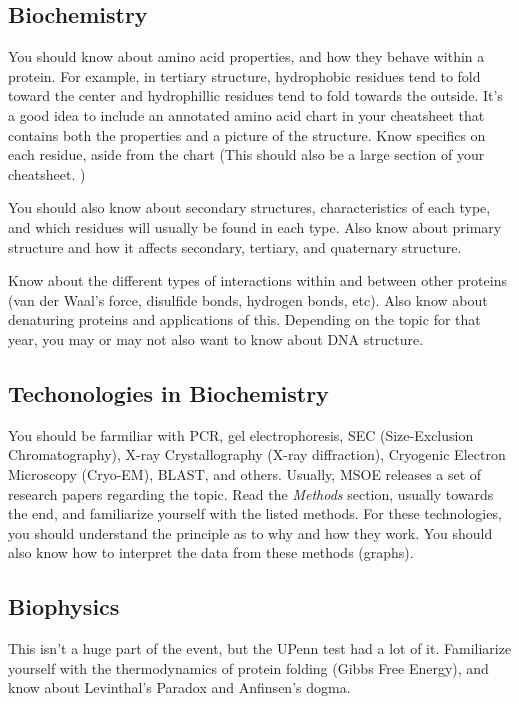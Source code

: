 \documentclass[twocolumn]{article}
\begin{document}
\subsection{Biochemistry}
You should know about amino acid properties, and how they behave within a protein. For example, in tertiary structure, hydrophobic residues tend to fold toward the center and hydrophillic residues tend to fold towards the outside. It's a good idea to include an annotated amino acid chart in your cheatsheet that contains both the properties and a picture of the structure. Know specifics on each residue, aside from the chart (This should also be a large section of your cheatsheet. )

You should also know about secondary structures, characteristics of each type, and which residues will usually be found in each type. Also know about primary structure and how it affects secondary, tertiary, and quaternary structure. 

Know about the different types of interactions within and between other proteins (van der Waal's force, disulfide bonds, hydrogen bonds, etc). Also know about denaturing proteins and applications of this. Depending on the topic for that year, you may or may not also want to know about DNA structure. 
\subsection{Techonologies in Biochemistry}
You should be farmiliar with PCR, gel electrophoresis, SEC (Size-Exclusion Chromatography), X-ray Crystallography (X-ray diffraction), Cryogenic Electron Microscopy (Cryo-EM), BLAST, and others. Usually, MSOE releases a set of research papers regarding the topic. Read the \emph{Methods} section, usually towards the end, and familiarize yourself with the listed methods. For these technologies, you should understand the principle as to why and how they work. You should also know how to interpret the data from these methods (graphs). 
\subsection{Biophysics}
This isn't a huge part of the event, but the UPenn test had a lot of it. Familiarize yourself with the thermodynamics of protein folding (Gibbs Free Energy), and know about Levinthal's Paradox and Anfinsen's dogma. 
\end{document}
